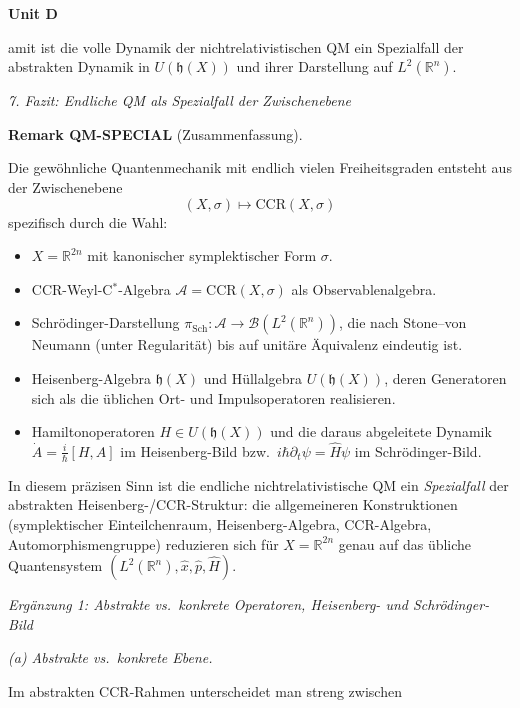 \documentclass[10pt, letterpaper]{article}
\newcommand{\CustomHeading}[3]{%
  \par\medskip\noindent%
  \textbf{#1 #2} \textnormal{(#3)}.\enskip%
}
\newenvironment{REM}[2]{\begin{unitbox}\CustomHeading{Remark}{#1}{#2}}{\end{unitbox}}
\newenvironment{unit}[1]
  {\begin{unitbox}\textbf{Unit #1}\par\smallskip}
  {\end{unitbox}}
\begin{document}
\begin{unit}
Damit ist die volle Dynamik der nichtrelativistischen QM
ein Spezialfall der abstrakten Dynamik in \(U(\mathfrak{h}(X))\)
und ihrer Darstellung auf \(L^2(\mathbb{R}^n)\).

\emph{7. Fazit: Endliche QM als Spezialfall der Zwischenebene}

\begin{REM}{QM-SPECIAL}{Zusammenfassung}
Die gewöhnliche Quantenmechanik mit endlich vielen Freiheitsgraden
entsteht aus der Zwischenebene
\[
(X,\sigma)\longmapsto \mathrm{CCR}(X,\sigma)
\]
spezifisch durch die Wahl:
\begin{itemize}
  \item \(X = \mathbb{R}^{2n}\) mit kanonischer symplektischer Form \(\sigma\).
  \item CCR-Weyl-C$^\ast$-Algebra \(\mathcal{A} = \mathrm{CCR}(X,\sigma)\) als Observablenalgebra.
  \item Schrödinger-Darstellung \(\pi_{\mathrm{Sch}}:\mathcal{A}\to\mathcal{B}(L^2(\mathbb{R}^n))\),
        die nach Stone--von Neumann (unter Regularität) bis auf unitäre Äquivalenz eindeutig ist.
  \item Heisenberg-Algebra \(\mathfrak{h}(X)\) und Hüllalgebra \(U(\mathfrak{h}(X))\),
        deren Generatoren sich als die üblichen Ort- und Impulsoperatoren
        realisieren.
  \item Hamiltonoperatoren \(H \in U(\mathfrak{h}(X))\) und die daraus
        abgeleitete Dynamik \(\dot{A}=\frac{i}{\hbar}[H,A]\) im Heisenberg-Bild
        bzw.\ \(i\hbar\partial_t\psi=\hat{H}\psi\) im Schrödinger-Bild.
\end{itemize}

In diesem präzisen Sinn ist die endliche nichtrelativistische QM
ein \emph{Spezialfall} der abstrakten Heisenberg-/CCR-Struktur:
die allgemeineren Konstruktionen (symplektischer Einteilchenraum,
Heisenberg-Algebra, CCR-Algebra, Automorphismengruppe)
reduzieren sich für \(X=\mathbb{R}^{2n}\) genau auf das übliche
Quantensystem \((L^2(\mathbb{R}^n),\hat{x},\hat{p},\hat{H})\).
\end{REM}




\emph{Ergänzung 1: Abstrakte vs.\ konkrete Operatoren, Heisenberg- und Schrödinger-Bild}

\emph{(a) Abstrakte vs.\ konkrete Ebene.}

Im abstrakten CCR-Rahmen unterscheidet man streng zwischen


\end{unit}
\end{document}

